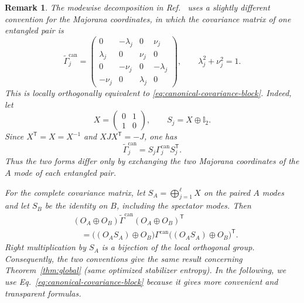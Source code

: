 \documentclass[prx,twocolumn,superscriptaddress,aps,10pt, frontmatterverbose, reprint,footinbib,longbibliography=true]{revtex4-2}
\newtheorem{remark}{Remark}
\begin{document}
\begin{remark}
The modewise decomposition in Ref.~\cite{BoteroReznik2004} uses a slightly different convention for the Majorana
coordinates, in which the covariance matrix of one entangled pair is
\begin{equation}
 \widetilde{\Gamma}^{\mathrm{can}}_j
 =
 \begin{pmatrix}
  0&-\lambda_j&0&\nu_j\\
  \lambda_j&0&\nu_j&0\\
  0&-\nu_j&0&-\lambda_j\\
  -\nu_j&0&\lambda_j&0
 \end{pmatrix},
 \qquad
 \lambda_j^2+\nu_j^2=1.
 \label{eq:botero-canonical-covariance-block}
\end{equation}
This is locally \textit{orthogonally equivalent} to
\eqref{eq:canonical-covariance-block}. Indeed, let
\begin{equation}
 X=\begin{pmatrix}0&1\\1&0\end{pmatrix},
 \qquad
 S_j=X\oplus \mathbb{I}_2.
\end{equation}
Since \(X^{\mathsf T}=X=X^{-1}\) and \(XJX^{\mathsf T}=-J\), one has
\begin{equation}
 \widetilde{\Gamma}^{\mathrm{can}}_j
 =S_j\Gamma^{\mathrm{can}}_jS_j^{\mathsf T}.
 \label{eq:botero-our-convention}
\end{equation}
Thus the two forms differ only by exchanging the two Majorana coordinates
of the \(A\) mode of each entangled pair.

For the complete covariance matrix, let
\(S_A=\bigoplus_{j=1}^{\ell}X\) on the paired \(A\) modes and let \(S_B\)
be the identity on \(B\), including the spectator modes. Then
\begin{equation}
\begin{aligned}
 &(O_A\oplus O_B)\widetilde{\Gamma}^{\mathrm{can}}
      (O_A\oplus O_B)^{\mathsf T} \\
 &\quad =
 \bigl((O_AS_A)\oplus O_B\bigr)\Gamma^{\mathrm{can}}
 \bigl((O_AS_A)\oplus O_B\bigr)^{\mathsf T}.
\end{aligned}
\label{eq:canonical-orbit-convention-equivalence}
\end{equation}
Right multiplication by \(S_A\) is a bijection of the local orthogonal
group. Consequently, the two conventions give the same result concerning Theorem~\ref{thm:global} (same optimized stabilizer entropy). 
In the following, we use Eq.~\eqref{eq:canonical-covariance-block} because it gives more convenient and transparent formulas.
\end{remark}
\end{document}
